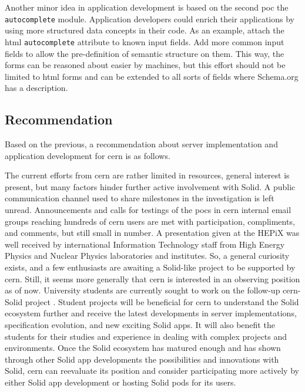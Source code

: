 Another minor idea in application development is based on the second \gls{poc} the \texttt{autocomplete} module.  Application developers could enrich their applications by using more structured data concepts in their code. As an example, attach the \gls{html} \texttt{autocomplete} attribute to known input fields. Add more common input fields to allow the pre-definition of semantic structure on them. This way, the forms can be reasoned about easier by machines, but this effort should not be limited to \gls{html} forms and can be extended to all sorts of fields where Schema.org has a description.

\subsection{Recommendation}

Based on the previous, a recommendation about server implementation and application development for \gls{cern} is as follows.

The current efforts from \gls{cern} are rather limited in resources, general interest is present, but many factors hinder further active involvement with Solid. A public communication channel used to share milestones in the investigation is left unread. Announcements and calls for testings of the \glspl{poc} in \gls{cern} internal email groups reaching hundreds of \gls{cern} users are met with participation, compliments, and comments, but still small in number. A presentation given at the HEPiX \cite{hepix} was well received by international Information Technology staff from High Energy Physics and Nuclear Physics laboratories and institutes. So, a general curiosity exists, and a few enthusiasts are awaiting a Solid-like project to be supported by \gls{cern}. Still, it seems more generally that \gls{cern} is interested in an observing position as of now. University students are currently sought to work on the follow-up \gls{cern}-Solid project \cite{cern-slides}. Student projects will be beneficial for \gls{cern} to understand the Solid ecosystem further and receive the latest developments in server implementations, specification evolution, and new exciting Solid apps. It will also benefit the students for their studies and experience in dealing with complex projects and environments. Once the Solid ecosystem has matured enough and has shown through other Solid app developments the possibilities and innovations with Solid, \gls{cern} can reevaluate its position and consider participating more actively by either Solid app development or hosting Solid pods for its users.
